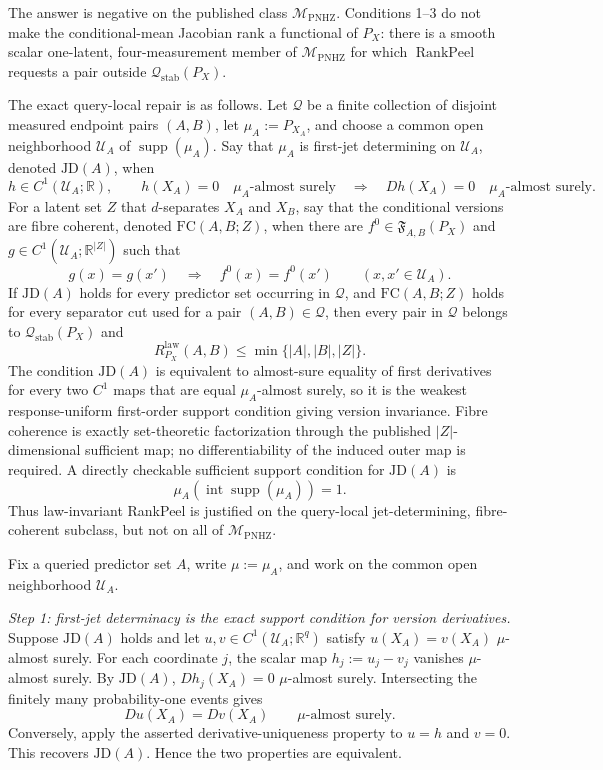 The answer is negative on the published class \(\mathcal M_{\mathrm{PNHZ}}\).  Conditions 1--3 do not make the conditional-mean Jacobian rank a functional of \(P_X\): there is a smooth scalar one-latent, four-measurement member of \(\mathcal M_{\mathrm{PNHZ}}\) for which \(\operatorname{RankPeel}\) requests a pair outside \(\mathcal Q_{\mathrm{stab}}(P_X)\).

The exact query-local repair is as follows.  Let \(\mathscr Q\) be a finite collection of disjoint measured endpoint pairs \((A,B)\), let \(\mu_A:=P_{X_A}\), and choose a common open neighborhood \(\mathcal U_A\) of \(\operatorname{supp}(\mu_A)\).  Say that \(\mu_A\) is first-jet determining on \(\mathcal U_A\), denoted \(\mathrm{JD}(A)\), when
\[
 h\in C^1(\mathcal U_A;\mathbb R),\qquad h(X_A)=0\quad\mu_A\text{-almost surely}
 \quad\Longrightarrow\quad
 Dh(X_A)=0\quad\mu_A\text{-almost surely}.
\]
For a latent set \(Z\) that \(d\)-separates \(X_A\) and \(X_B\), say that the conditional versions are fibre coherent, denoted \(\mathrm{FC}(A,B;Z)\), when there are \(f^0\in\mathfrak F_{A,B}(P_X)\) and \(g\in C^1(\mathcal U_A;\mathbb R^{|Z|})\) such that
\[
 g(x)=g(x')\quad\Longrightarrow\quad f^0(x)=f^0(x')
 \qquad(x,x'\in\mathcal U_A).
\]
If \(\mathrm{JD}(A)\) holds for every predictor set occurring in \(\mathscr Q\), and \(\mathrm{FC}(A,B;Z)\) holds for every separator cut used for a pair \((A,B)\in\mathscr Q\), then every pair in \(\mathscr Q\) belongs to \(\mathcal Q_{\mathrm{stab}}(P_X)\) and
\[
 R^{\mathrm{law}}_{P_X}(A,B)
 \leq \min\{|A|,|B|,|Z|\}.
\]
The condition \(\mathrm{JD}(A)\) is equivalent to almost-sure equality of first derivatives for every two \(C^1\) maps that are equal \(\mu_A\)-almost surely, so it is the weakest response-uniform first-order support condition giving version invariance.  Fibre coherence is exactly set-theoretic factorization through the published \(|Z|\)-dimensional sufficient map; no differentiability of the induced outer map is required.  A directly checkable sufficient support condition for \(\mathrm{JD}(A)\) is
\[
 \mu_A\!\left(\operatorname{int}\operatorname{supp}(\mu_A)\right)=1.
\]
Thus law-invariant RankPeel is justified on the query-local jet-determining, fibre-coherent subclass, but not on all of \(\mathcal M_{\mathrm{PNHZ}}\).

Fix a queried predictor set \(A\), write \(\mu:=\mu_A\), and work on the common open neighborhood \(\mathcal U_A\).

\emph{Step 1: first-jet determinacy is the exact support condition for version derivatives.}
Suppose \(\mathrm{JD}(A)\) holds and let \(u,v\in C^1(\mathcal U_A;\mathbb R^q)\) satisfy \(u(X_A)=v(X_A)\) \(\mu\)-almost surely.  For each coordinate \(j\), the scalar map \(h_j:=u_j-v_j\) vanishes \(\mu\)-almost surely.  By \(\mathrm{JD}(A)\), \(Dh_j(X_A)=0\) \(\mu\)-almost surely.  Intersecting the finitely many probability-one events gives
\[
 Du(X_A)=Dv(X_A)\qquad\mu\text{-almost surely}. \tag{1}
\]
Conversely, apply the asserted derivative-uniqueness property to \(u=h\) and \(v=0\).  This recovers \(\mathrm{JD}(A)\).  Hence the two properties are equivalent.

